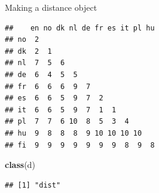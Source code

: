 \documentclass[ignorenonframetext,]{beamer}
\newenvironment{Shaded}{\begin{snugshade}}{\end{snugshade}}
\newcommand{\KeywordTok}[1]{\textcolor[rgb]{0.13,0.29,0.53}{\textbf{#1}}}
\newcommand{\NormalTok}[1]{#1}
\newcommand{\OperatorTok}[1]{\textcolor[rgb]{0.81,0.36,0.00}{\textbf{#1}}}
\newcommand{\StringTok}[1]{\textcolor[rgb]{0.31,0.60,0.02}{#1}}
\begin{document}
\begin{frame}[fragile]{Making a distance object}
\protect\hypertarget{making-a-distance-object}{}

\begin{Shaded}
\end{Shaded}

\begin{verbatim}
##    en no dk nl de fr es it pl hu
## no  2                           
## dk  2  1                        
## nl  7  5  6                     
## de  6  4  5  5                  
## fr  6  6  6  9  7               
## es  6  6  5  9  7  2            
## it  6  6  5  9  7  1  1         
## pl  7  7  6 10  8  5  3  4      
## hu  9  8  8  8  9 10 10 10 10   
## fi  9  9  9  9  9  9  9  8  9  8
\end{verbatim}

\begin{Shaded}
\begin{Highlighting}[]
\KeywordTok{class}\NormalTok{(d)}
\end{Highlighting}
\end{Shaded}

\begin{verbatim}
## [1] "dist"
\end{verbatim}

\end{frame}
\end{document}
